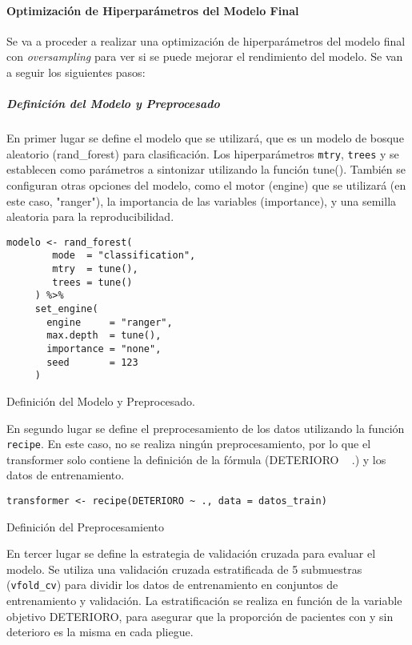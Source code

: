 \paragraph{Optimización de Hiperparámetros del Modelo Final}

Se va a proceder a realizar una optimización de hiperparámetros del modelo final con \textit{oversampling} para ver si se puede mejorar el rendimiento del modelo. Se van a seguir los siguientes pasos:

\subparagraph{Definición del Modelo y Preprocesado}

En primer lugar se define el modelo que se utilizará, que es un modelo de bosque aleatorio (rand\_forest) para clasificación. Los hiperparámetros \texttt{mtry}, \texttt{trees} y  se establecen como parámetros a sintonizar utilizando la función tune(). También se configuran otras opciones del modelo, como el motor (engine) que se utilizará (en este caso, "ranger"), la importancia de las variables (importance), y una semilla aleatoria para la reproducibilidad.

\begin{code}[H]
\begin{lstlisting}[style=mystyle]
    modelo <- rand_forest(
        mode  = "classification",
        mtry  = tune(),
        trees = tune()
     ) %>%
     set_engine(
       engine     = "ranger",
       max.depth  = tune(),
       importance = "none",
       seed       = 123
     )
\end{lstlisting}
\caption{Definición del Modelo y Preprocesado.}
\label{code:Definición del Modelo y Preprocesado}
\end{code}

En segundo lugar se define el preprocesamiento de los datos utilizando la función \texttt{recipe}. En este caso, no se realiza ningún preprocesamiento, por lo que el transformer solo contiene la definición de la fórmula (DETERIORO ~ .) y los datos de entrenamiento.

\begin{code}[H]
\begin{lstlisting}[style=mystyle]
    transformer <- recipe(DETERIORO ~ ., data = datos_train)
\end{lstlisting}
\caption{Definición del Preprocesamiento}
\label{code:Definición del Preprocesamiento}
\end{code}

En tercer lugar se define la estrategia de validación cruzada para evaluar el modelo. Se utiliza una validación cruzada estratificada de 5 submuestras (\texttt{vfold\_cv}) para dividir los datos de entrenamiento en conjuntos de entrenamiento y validación. La estratificación se realiza en función de la variable objetivo DETERIORO, para asegurar que la proporción de pacientes con y sin deterioro es la misma en cada pliegue.

